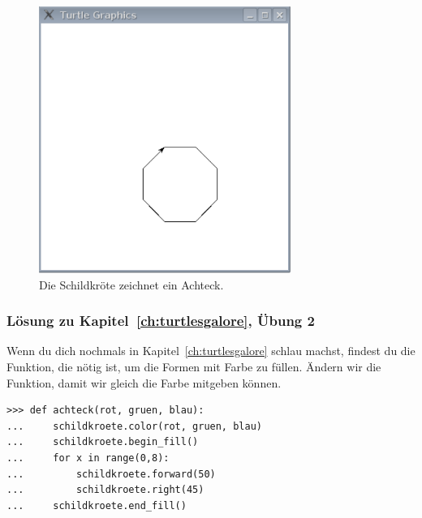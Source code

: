 \begin{figure}
\begin{center}
\includegraphics[width=82mm]{images/figure48}
\end{center}
\caption{Die Schildkröte zeichnet ein Achteck.}\label{fig48}
\end{figure}

\noindent
\subsubsection{Lösung zu Kapitel~\ref{ch:turtlesgalore}, Übung 2}
Wenn du dich nochmals in Kapitel~\ref{ch:turtlesgalore} schlau machst, findest du die Funktion, die nötig ist, um die Formen mit Farbe zu füllen. Ändern wir die  Funktion, damit wir gleich die Farbe mitgeben können.

\begin{Verbatim}[frame=single]
>>> def achteck(rot, gruen, blau):
...     schildkroete.color(rot, gruen, blau)
...     schildkroete.begin_fill()
...     for x in range(0,8):
...         schildkroete.forward(50)
...         schildkroete.right(45)
...     schildkroete.end_fill()
\end{Verbatim}

